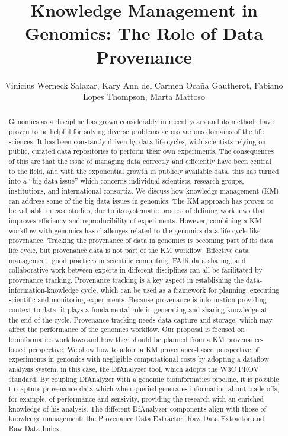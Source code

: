 \documentclass[twoside]{article}
\title{\vspace{-15mm}\fontsize{24pt}{10pt}\selectfont\textbf{ Knowledge Management in Genomics: The Role of Data Provenance }} %
\author{ Vinicius Werneck Salazar, Kary Ann del Carmen Oca\~na Gautherot, Fabiano Lopes Thompson, Marta Mattoso }
\affil{ LNCC,  National Laboratory of Scientific Computing,  Petr\'opolis,  Brazil }
\date{}
\begin{document}
  
  
  \maketitle %
  
  
  \thispagestyle{fancy} %
  
  
  \begin{abstract}
  Genomics as a discipline has grown considerably in recent years and its methods have proven to be helpful for solving diverse problems across various domains of the life sciences. It has been constantly driven by data life cycles,  with scientists relying on public,  curated data repositories to perform their own experiments. The consequences of this are that the issue of managing data correctly and efficiently have been central to the field,  and with the exponential growth in publicly available data,  this has turned into a “big data issue” which concerns individual scientists,  research groups,  institutions,  and international consortia. We discuss how knowledge management (KM) can address some of the big data issues in genomics. The KM approach has proven to be valuable in case studies,  due to its systematic process of defining workflows that improves efficiency and reproducibility of experiments. However,  combining a KM workflow with genomics has challenges related to the genomics data life cycle like provenance. Tracking the provenance of data in genomics is becoming part of its data life cycle,  but provenance data is not part of the KM workflow. Effective data management,  good practices in scientific computing,  FAIR data sharing,  and collaborative work between experts in different disciplines can all be facilitated by provenance tracking. Provenance tracking is a key aspect in establishing the data-information-knowledge cycle,  which can be used as a framework for planning,  executing scientific and monitoring experiments. Because provenance is information providing context to data,  it plays a fundamental role in generating and sharing knowledge at the end of the cycle. Provenance tracking needs data capture and storage,  which may affect the performance of the genomics workflow. Our proposal is focused on bioinformatics workflows and how they should be planned from a KM provenance-based perspective. We show how to adopt a KM provenance-based perspective of experiments in genomics with negligible computational costs by adopting a dataflow analysis system,  in this case,  the DfAnalyzer tool,  which adopts the W3C PROV standard. By coupling DfAnalyzer with a genomic bioinformatics pipeline,  it is possible to capture provenance data which when queried generates information about trade-offs,  for example,  of performance and sensivity,  providing the research with an enriched knowledge of his analysis. The different DfAnalyzer components align with those of knowledge management: the Provenance Data Extractor,  Raw Data Extractor and Raw Data Index 
\end{abstract}
\end{document}
